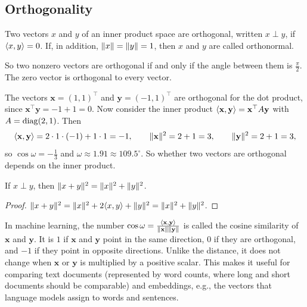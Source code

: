 \subsection{Orthogonality}

\begin{definition}[Orthogonality]
    Two vectors $x$ and $y$ of an inner product space are orthogonal, written $x \perp y$, if $\langle x, y \rangle = 0$. If, in addition, $\lVert x \rVert = \lVert y \rVert = 1$, then $x$ and $y$ are called orthonormal.
\end{definition}

So two nonzero vectors are orthogonal if and only if the angle between them is $\frac{\pi}{2}$. The zero vector is orthogonal to every vector.

\begin{example}\label{L2-ex:orth-depends}
    The vectors $\mathbf{x} = (1, 1)^\top$ and $\mathbf{y} = (-1, 1)^\top$ are orthogonal for the dot product, since $\mathbf{x}^\top \mathbf{y} = -1 + 1 = 0$. Now consider the inner product $\langle \mathbf{x}, \mathbf{y} \rangle = \mathbf{x}^\top A \mathbf{y}$ with $A = \operatorname{diag}(2, 1)$. Then
    \[\langle \mathbf{x}, \mathbf{y} \rangle = 2 \cdot 1 \cdot (-1) + 1 \cdot 1 = -1, \qquad \lVert \mathbf{x} \rVert^2 = 2 + 1 = 3, \qquad \lVert \mathbf{y} \rVert^2 = 2 + 1 = 3,\]
    so $\cos\omega = -\frac{1}{3}$ and $\omega \approx 1.91 \approx 109.5^\circ$. So whether two vectors are orthogonal depends on the inner product.
\end{example}

\begin{theorem}[Pythagoras]\label{L2-thm:pythagoras}
    If $x \perp y$, then $\lVert x + y \rVert^2 = \lVert x \rVert^2 + \lVert y \rVert^2$.
\end{theorem}

\begin{proof}
    $\lVert x + y \rVert^2 = \lVert x \rVert^2 + 2\langle x, y \rangle + \lVert y \rVert^2 = \lVert x \rVert^2 + \lVert y \rVert^2$.
\end{proof}

\begin{remark}
    In machine learning, the number $\cos\omega = \frac{\langle \mathbf{x}, \mathbf{y} \rangle}{\lVert \mathbf{x} \rVert \lVert \mathbf{y} \rVert}$ is called the cosine similarity of $\mathbf{x}$ and $\mathbf{y}$. It is $1$ if $\mathbf{x}$ and $\mathbf{y}$ point in the same direction, $0$ if they are orthogonal, and $-1$ if they point in opposite directions. Unlike the distance, it does not change when $\mathbf{x}$ or $\mathbf{y}$ is multiplied by a positive scalar. This makes it useful for comparing text documents (represented by word counts, where long and short documents should be comparable) and embeddings, e.g., the vectors that language models assign to words and sentences.
\end{remark}

